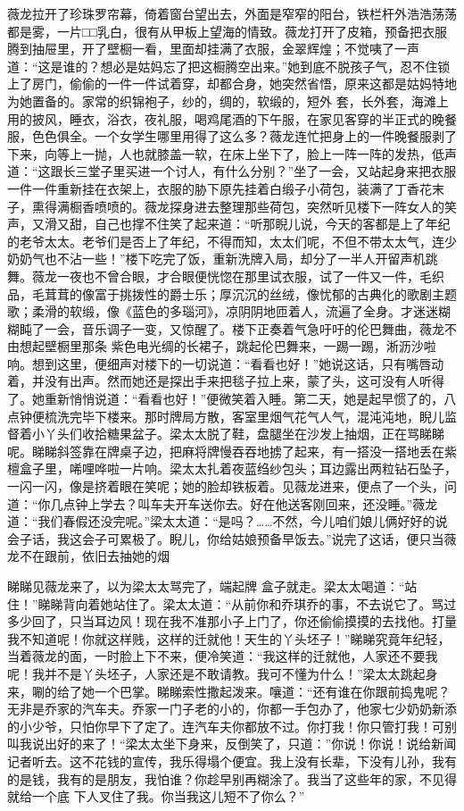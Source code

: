\documentclass{article}
\begin{document}
薇龙拉开了珍珠罗帘幕，倚着窗台望出去，外面是窄窄的阳台，铁栏杆外浩浩荡荡都是雾，一片□□乳白，很有从甲板上望海的情致。薇龙打开了皮箱，预备把衣服腾到抽屉里，开了壁橱一看，里面却挂满了衣服，金翠辉煌；不觉咦了一声道：“这是谁的？想必是姑妈忘了把这橱腾空出来。”她到底不脱孩子气，忍不住锁上了房门，偷偷的一件一件试着穿，却都合身，她突然省悟，原来这都是姑妈特地为她置备的。家常的织锦袍子，纱的，绸的，软缎的，短外
\newpage
套，长外套，海滩上用的披风，睡衣，浴衣，夜礼服，喝鸡尾酒的下午服，在家见客穿的半正式的晚餐服，色色俱全。一个女学生哪里用得了这么多？薇龙连忙把身上的一件晚餐服剥了下来，向等上一抛，人也就膝盖一软，在床上坐下了，脸上一阵一阵的发热，低声道：“这跟长三堂子里买进一个讨人，有什么分别？”坐了一会，又站起身来把衣服一件一件重新挂在衣架上，衣服的胁下原先挂着白缎子小荷包，装满了丁香花末子，熏得满橱香喷喷的。薇龙探身进去整理那些荷包，突然听见楼下一阵女人的笑声，又滑又甜，自己也撑不住笑了起来道：“听那睨儿说，今天的客都是上了年纪的老爷太太。老爷们是否上了年纪，不得而知，太太们呢，不但不带太太气，连少奶奶气也不沾一些！”楼下吃完了饭，重新洗牌入局，却分了一半人开留声机跳舞。薇龙一夜也不曾合眼，才合眼便恍惚在那里试衣服，试了一件又一件，毛织品，毛茸茸的像富于挑拨性的爵士乐；厚沉沉的丝绒，像忧郁的古典化的歌剧主题歌；柔滑的软缎，像《蓝色的多瑙河》，凉阴阴地匝着人，流遍了全身。才迷迷糊糊盹了一会，音乐调子一变，又惊醒了。楼下正奏着气急吁吁的伦巴舞曲，薇龙不由想起壁橱里那条
\newpage
紫色电光绸的长裙子，跳起伦巴舞来，一踢一踢，淅沥沙啦响。想到这里，便细声对楼下的一切说道：“看看也好！”她说这话，只有嘴唇动着，并没有出声。然而她还是探出手来把毯子拉上来，蒙了头，这可没有人听得了。她重新悄悄说道：“看看也好！”便微笑着入睡。第二天，她是起早惯了的，八点钟便梳洗完毕下楼来。那时牌局方散，客室里烟气花气人气，混沌沌地，睨儿监督着小丫头们收拾糖果盆子。梁太太脱了鞋，盘腿坐在沙发上抽烟，正在骂睇睇呢。睇睇斜签靠在牌桌子边，把麻将牌慢吞吞地掳了起来，有一搭没一搭地丢在紫檀盒子里，唏哩哗啦一片响。梁太太扎着夜蓝绉纱包头；耳边露出两粒钻石坠子，一闪一闪，像是挤着眼在笑呢；她的脸却铁板着。见薇龙进来，便点了一个头，问道：“你几点钟上学去？叫车夫开车送你去。好在他送客刚回来，还没睡。”薇龙道：“我们春假还没完呢。”梁太太道：“是吗？……不然，今儿咱们娘儿俩好好的说会子话，我这会子可累极了。睨儿，你给姑娘预备早饭去。”说完了这话，便只当薇龙不在跟前，依旧去抽她的烟

睇睇见薇龙来了，以为梁太太骂完了，端起牌
\newpage
盒子就走。梁太太喝道：“站住！”睇睇背向着她站住了。梁太太道：“从前你和乔琪乔的事，不去说它了。骂过多少回了，只当耳边风！现在我不准那小子上门了，你还偷偷摸摸的去找他。打量我不知道呢！你就这样贱，这样的迁就他！天生的丫头坯子！”睇睇究竟年纪轻，当着薇龙的面，一时脸上下不来，便冷笑道：“我这样的迁就他，人家还不要我呢！我并不是丫头坯子，人家还是不敢请教。我可不懂为什么！”梁太太跳起身来，唰的给了她一个巴掌。睇睇索性撒起泼来。嚷道：“还有谁在你跟前捣鬼呢？无非是乔家的汽车夫。乔家一门子老的小的，你都一手包办了，他家七少奶奶新添的小少爷，只怕你早下了定了。连汽车夫你都放不过。你打我！你只管打我！可别叫我说出好的来了！“梁太太坐下身来，反倒笑了，只道：”你说！你说！说给新闻记者听去。这不花钱的宣传，我乐得塌个便宜。我上没有长辈，下没有儿孙，我有的是钱，我有的是朋友，我怕谁？你趁早别再糊涂了。我当了这些年的家，不见得就给一个底
下人叉住了我。你当我这儿短不了你么？” 
\end{document}
